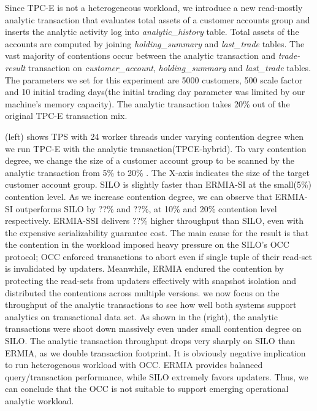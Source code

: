 Since TPC-E is not a heterogeneous workload, we introduce a new read-mostly analytic transaction that evaluates total assets of a customer accounts group and inserts the analytic activity log into \textit{analytic\_history} table. Total assets of the accounts are computed by joining \textit{holding\_summary} and \textit{last\_trade} tables. The vast majority of contentions occur between the analytic transaction and \textit{trade-result} transaction on \textit{customer\_account}, \textit{holding\_summary} and \textit{last\_trade} tables. 
The parameters we set for this experiment are 5000 customers, 500 scale factor and 10 initial trading days(the initial trading day parameter was limited by our machine's memory capacity). %
The analytic transaction takes 20\% out of the original TPC-E transaction mix. %


(left) shows TPS with 24 worker threads under varying contention degree when we run TPC-E with the analytic transaction(TPCE-hybrid). To vary contention degree, we change the size of a customer account group to be scanned by the analytic transaction from 5\% to 20\% . The X-axis indicates the size of the target customer account group. SILO is slightly faster than ERMIA-SI at the small(5\%) contention level. As we increase contention degree, we can observe that ERMIA-SI outperforms SILO by ??\% and ??\%, at 10\% and 20\% contention level respectively. ERMIA-SSI delivers ??\% higher throughput than SILO, even with the expensive serializability guarantee cost. 
The main cause for the result is that the contention in the workload imposed heavy pressure on the SILO's OCC protocol; OCC enforced transactions to abort even if single tuple of their read-set is invalidated by updaters. Meanwhile, ERMIA endured the contention by protecting the read-sets from updaters effectively with snapshot isolation and distributed the contentions across multiple versions. 
we now focus on the throughput of the analytic transactions to see how well both systems support analytics on transactional data set. As shown in the (right), the analytic transactions were shoot down massively even under small contention degree on SILO. The analytic transaction throughput drops very sharply on SILO than ERMIA, as we double transaction footprint. It is obviously negative implication to run heterogenous workload with OCC. ERMIA provides balanced query/transaction performance, while SILO extremely favors updaters. Thus, we can conclude that the OCC is not suitable to support emerging operational analytic workload. 

